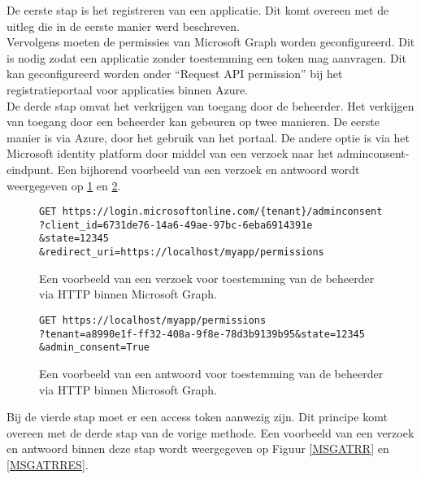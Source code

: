 De eerste stap is het registreren van een applicatie. Dit komt overeen met de uitleg die in de eerste manier werd beschreven. \\

Vervolgens moeten de permissies van Microsoft Graph worden geconfigureerd. Dit is nodig zodat een applicatie zonder toestemming een token mag aanvragen. Dit kan geconfigureerd worden onder “Request \ac{API} permission” bij het registratieportaal voor applicaties binnen Azure. \\

De derde stap omvat het verkrijgen van toegang door de beheerder. Het verkijgen van toegang door een beheerder kan gebeuren op twee manieren. De eerste manier is via Azure, door het gebruik van het portaal. De andere optie is via het Microsoft identity platform door middel van een verzoek naar het adminconsent-eindpunt. Een bijhorend voorbeeld van een verzoek en antwoord wordt weergegeven op \ref{MSGRAR} en \ref{MSGRARES}. \\

\begin{figure}[!h]
    \footnotesize\begin{verbatim}
GET https://login.microsoftonline.com/{tenant}/adminconsent
?client_id=6731de76-14a6-49ae-97bc-6eba6914391e
&state=12345
&redirect_uri=https://localhost/myapp/permissions
    \end{verbatim}    
    \caption[Voorbeeld Adminconsent request Microsoft Graph]{Een voorbeeld van een verzoek voor toestemming van de beheerder via \ac{HTTP} binnen Microsoft Graph.}
    \label{MSGRAR}
\end{figure}

\begin{figure}[!h]
    \footnotesize\begin{verbatim}
GET https://localhost/myapp/permissions
?tenant=a8990e1f-ff32-408a-9f8e-78d3b9139b95&state=12345
&admin_consent=True
    \end{verbatim}    
    \caption[Voorbeeld Adminconsent respons Microsoft Graph]{Een voorbeeld van een antwoord voor toestemming van de beheerder via \ac{HTTP} binnen Microsoft Graph.}
    \label{MSGRARES}
\end{figure}

Bij de vierde stap moet er een access token aanwezig zijn. Dit principe komt overeen met de derde stap van de vorige methode. Een voorbeeld van een verzoek en antwoord binnen deze stap wordt weergegeven op Figuur \ref{MSGATRR} en \ref{MSGATRRES}. \\

